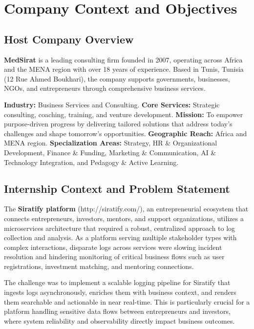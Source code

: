 \documentclass[12pt,a4paper]{report}
\begin{document}
\chapter{Company Context and Objectives}
\section{Host Company Overview}
\textbf{MedSirat} is a leading consulting firm founded in 2007, operating across Africa and the MENA region with over 18 years of experience. Based in Tunis, Tunisia (12 Rue Ahmed Boukhari), the company supports governments, businesses, NGOs, and entrepreneurs through comprehensive business services.

\textbf{Industry:} Business Services and Consulting. \textbf{Core Services:} Strategic consulting, coaching, training, and venture development. \textbf{Mission:} To empower purpose-driven progress by delivering tailored solutions that address today's challenges and shape tomorrow's opportunities. \textbf{Geographic Reach:} Africa and MENA region. \textbf{Specialization Areas:} Strategy, HR \& Organizational Development, Finance \& Funding, Marketing \& Communication, AI \& Technology Integration, and Pedagogy \& Active Learning.

\section{Internship Context and Problem Statement}
The \textbf{Siratify platform} (http://siratify.com/), an entrepreneurial ecosystem that connects entrepreneurs, investors, mentors, and support organizations, utilizes a microservices architecture that required a robust, centralized approach to log collection and analysis. As a platform serving multiple stakeholder types with complex interactions, disparate logs across services were slowing incident resolution and hindering monitoring of critical business flows such as user registrations, investment matching, and mentoring connections.

The challenge was to implement a scalable logging pipeline for Siratify that ingests logs asynchronously, enriches them with business context, and renders them searchable and actionable in near real-time. This is particularly crucial for a platform handling sensitive data flows between entrepreneurs and investors, where system reliability and observability directly impact business outcomes.
\end{document}
